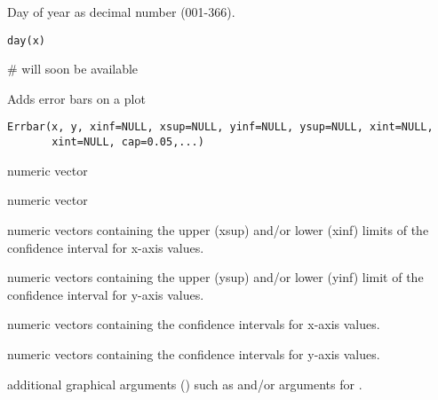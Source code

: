 \documentclass[a4paper]{book}
\begin{document}
\newpage
{}
%
\begin{Description}\relax
Day of year as decimal number (001-366).
\end{Description}
%
\begin{Usage}
\begin{verbatim}
day(x)
\end{verbatim}
\end{Usage}
%
\begin{Arguments}
\begin{ldescription}
\item[\code{x}] 


\end{ldescription}
\end{Arguments}
%
\begin{Examples}
\begin{ExampleCode}
# will soon be available
\end{ExampleCode}
\end{Examples}
\newpage
{}
%
\begin{Description}\relax
Adds error bars on a plot
\end{Description}
%
\begin{Usage}
\begin{verbatim}
Errbar(x, y, xinf=NULL, xsup=NULL, yinf=NULL, ysup=NULL, xint=NULL,
       xint=NULL, cap=0.05,...)
\end{verbatim}
\end{Usage}
%
\begin{Arguments}
\begin{ldescription}
\item[\code{x }] numeric vector

\item[\code{y}] numeric vector

\item[\code{xinf, xsup}] numeric vectors containing the upper (xsup) and/or lower (xinf)
limits of the confidence interval for x-axis values.

\item[\code{yinf, ysup}] numeric vectors containing the upper (ysup) and/or lower (yinf)
limit of the confidence interval for y-axis values.

\item[\code{xint}] numeric vectors containing the confidence intervals for x-axis values.

\item[\code{yint}] numeric vectors containing the confidence intervals for y-axis values.

\item[\code{...}] additional graphical arguments () such as 
and/or arguments for  .

\end{ldescription}
\end{Arguments}
\end{document}
